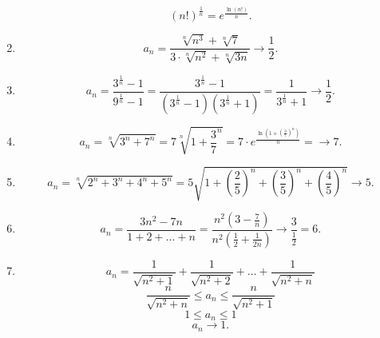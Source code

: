 \begin{enumerate}
    \begin{equation*}
        (n!)^{\frac{1}{n}} = e^{\frac{\ln(n!)}{n}}
    .\end{equation*}

\item
    \begin{equation*}
        a_n = \frac{\sqrt[n]{n^3} + \sqrt[n]{7}}{3 \cdot \sqrt[n]{n^2} + \sqrt[n]{3n}} \to \frac{1}{2}
    .\end{equation*}

\item
    \begin{equation*}
        a_n = \frac{3^{\frac{1}{n}} - 1}{9^{\frac{1}{n}} - 1} = \frac{3^{\frac{1}{n}} - 1}{(3^{\frac{1}{n}} - 1)(3^{\frac{1}{n}} + 1)} = \frac{1}{3^{\frac{1}{n}} + 1} \to \frac{1}{2}
    .\end{equation*}

\item
    \begin{equation*}
        a_n = \sqrt[n]{3^n + 7^n} = 7 \sqrt[n]{1 + \frac{3}{7}^n} = 7 \cdot e^{\frac{\ln(1 + (\frac{3}{7})^n)}{n}} = \to 7
    .\end{equation*}

\item
    \begin{equation*}
        a_n = \sqrt[n]{2^n + 3^n + 4^n + 5^n} = 5\sqrt{1 + \left(\frac{2}{5}\right)^n + \left(\frac{3}{5}\right)^n + \left(\frac{4}{5}\right)^n} \to 5
    .\end{equation*}

\item
    \begin{equation*}
        a_n = \frac{3n^2 - 7n}{1 + 2 + \dots + n} = \frac{n^2(3 - \frac{7}{n})}{n^2(\frac{1}{2} + \frac{1}{2n})} \to \frac{3}{\frac{1}{2}} = 6
    .\end{equation*}

\item
    \begin{equation*}
        a_n = \frac{1}{\sqrt{n^2 + 1}} + \frac{1}{\sqrt{n^2 + 2}} + \dots + \frac{1}{\sqrt{n^2 + n}}
    \end{equation*}
    \begin{equation*}
        \frac{n}{\sqrt{n^2 + n}} \leq a_n \leq \frac{n}{\sqrt{n^2 + 1}}
    \end{equation*}
    \begin{equation*}
        1 \leq a_n \leq 1
    \end{equation*}
    \begin{equation*}
        a_n \to 1
    .\end{equation*}


\end{enumerate}
